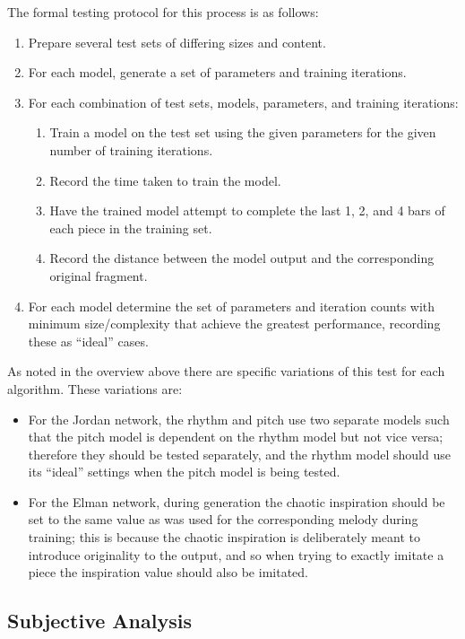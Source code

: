 \documentclass[ author={Stephen Livermore-Tozer},
				supervisor={Dr. Peter Flach},
				degree={MEng},
				title={Algorithmic Co-composition Using Machine Learning},
				subtitle={},
				type={research},
				year={2016} ]{dissertation}
\begin{document}
	The formal testing protocol for this process is as follows:
	\begin{enumerate}
		\item Prepare several test sets of differing sizes and content.
		\item For each model, generate a set of parameters and training iterations.
		\item For each combination of test sets, models, parameters, and training iterations:
		\begin{enumerate}
			\item Train a model on the test set using the given parameters for the given number of training iterations.
			\item Record the time taken to train the model.
			\item Have the trained model attempt to complete the last 1, 2, and 4 bars of each piece in the training set.
			\item Record the distance between the model output and the corresponding original fragment.
		\end{enumerate}
		\item For each model determine the set of parameters and iteration counts with minimum size/complexity that achieve the greatest performance, recording these as ``ideal'' cases.
	\end{enumerate}
	
	As noted in the overview above there are specific variations of this test for each algorithm. These variations are:
	\begin{itemize}
		\item For the Jordan network, the rhythm and pitch use two separate models such that the pitch model is dependent on the rhythm model but not vice versa; therefore they should be tested separately, and the rhythm model should use its ``ideal'' settings when the pitch model is being tested.
		\item For the Elman network, during generation the chaotic inspiration should be set to the same value as was used for the corresponding melody during training; this is because the chaotic inspiration is deliberately meant to introduce originality to the output, and so when trying to exactly imitate a piece the inspiration value should also be imitated.
	\end{itemize}
	
	\subsection{Subjective Analysis}
	\label{sec:subjective-analysis}
	
\end{document}
